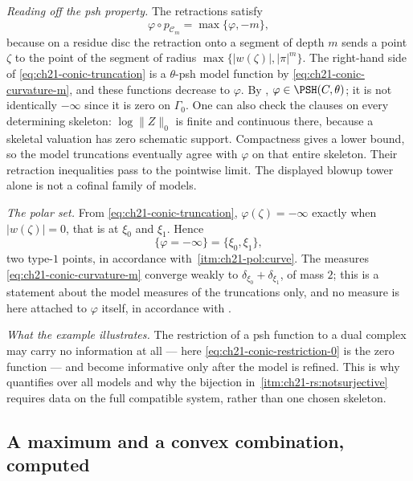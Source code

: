 \begin{example}
\emph{Reading off the psh property.}  The retractions satisfy
\begin{equation}
\label{eq:ch21-conic-truncation}
 \varphi\circ p_{\mathcal C_m}=\max\{\varphi,-m\},
\end{equation}
because on a residue disc the retraction onto a segment of depth $m$ sends
a point $\zeta$ to the point of the segment of radius
$\max\{|w(\zeta)|,|\pi|^m\}$.  The right-hand side of
\eqref{eq:ch21-conic-truncation} is a $\theta$-psh model function by
\eqref{eq:ch21-conic-curvature-m}, and these functions decrease to
$\varphi$.  By ,
$\varphi\in\PSH(C,\theta)$; it is not identically $-\infty$ since
it is zero on $\Gamma_0$.  One can also check the clauses on every
determining skeleton: $\log\lVert Z\rVert_0$ is finite and continuous
there, because a skeletal valuation has zero schematic support.
Compactness gives a lower bound, so the model truncations eventually agree
with $\varphi$ on that entire skeleton.  Their retraction inequalities
pass to the pointwise limit.  The displayed blowup tower alone is not a
cofinal family of models.

\emph{The polar set.}  From \eqref{eq:ch21-conic-truncation},
$\varphi(\zeta)=-\infty$ exactly when $|w(\zeta)|=0$, that is at
$\xi_0$ and $\xi_1$.  Hence
\[
 \{\varphi=-\infty\}=\{\xi_0,\xi_1\},
\]
two type-$1$ points, in accordance with
\,\cref{itm:ch21-pol:curve}.  The measures
\eqref{eq:ch21-conic-curvature-m} converge weakly to
$\delta_{\xi_0}+\delta_{\xi_1}$, of mass $2$; this is a statement about
the model measures of the truncations only, and no measure is here attached
to $\varphi$ itself, in accordance with .

\emph{What the example illustrates.}  The restriction of a psh function to
a dual complex may carry no information at all --- here
\eqref{eq:ch21-conic-restriction-0} is the zero function --- and become
informative only after the model is refined.  This is why
 quantifies over all models and why
the bijection in
\,\cref{itm:ch21-rs:notsurjective}
requires data on the full compatible system, rather than one chosen skeleton.
\end{example}

\subsection{A maximum and a convex combination, computed}
\label{sec:ch21-worked-max}

